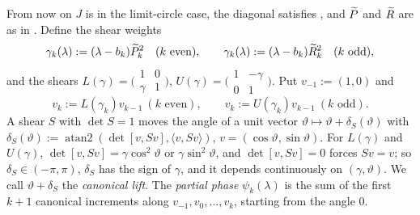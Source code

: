 From now on $J$ is in the limit-circle case, the diagonal satisfies , and
$\widetilde P$ and $\widetilde R$ are as in . Define the shear weights
\begin{equation}\label{eq:gamma}
  \gamma_k(\lambda):=(\lambda-b_k)\widetilde P_k^2\quad(k\text{ even}),\qquad
  \gamma_k(\lambda):=(\lambda-b_k)\widetilde R_k^2\quad(k\text{ odd}),
\end{equation}
and the shears $L(\gamma)=\bigl(\begin{smallmatrix}1&0\\\gamma&1\end{smallmatrix}\bigr)$,
$U(\gamma)=\bigl(\begin{smallmatrix}1&-\gamma\\0&1\end{smallmatrix}\bigr)$. Put
$v_{-1}:=(1,0)$ and
\[
  v_k:=L(\gamma_k)v_{k-1}\ (k\text{ even}),\qquad v_k:=U(\gamma_k)v_{k-1}\ (k\text{ odd}).
\]
A shear $S$ with $\det S=1$ moves the angle of a unit vector
$\vartheta\mapsto\vartheta+\delta_S(\vartheta)$ with
$\delta_S(\vartheta):=\operatorname{atan2}(\det[v,Sv],\langle v,Sv\rangle)$,
$v=(\cos\vartheta,\sin\vartheta)$. For $L(\gamma)$ and $U(\gamma)$,
$\det[v,Sv]=\gamma\cos^2\vartheta$ or $\gamma\sin^2\vartheta$, and $\det[v,Sv]=0$ forces
$Sv=v$; so $\delta_S\in(-\pi,\pi)$, $\delta_S$ has the sign of $\gamma$, and it depends
continuously on $(\gamma,\vartheta)$. We call $\vartheta+\delta_S$ the \emph{canonical
lift}. The \emph{partial phase} $\psi_k(\lambda)$ is the sum of the first $k+1$ canonical
increments along $v_{-1},v_0,\dots,v_k$, starting from the angle $0$.

